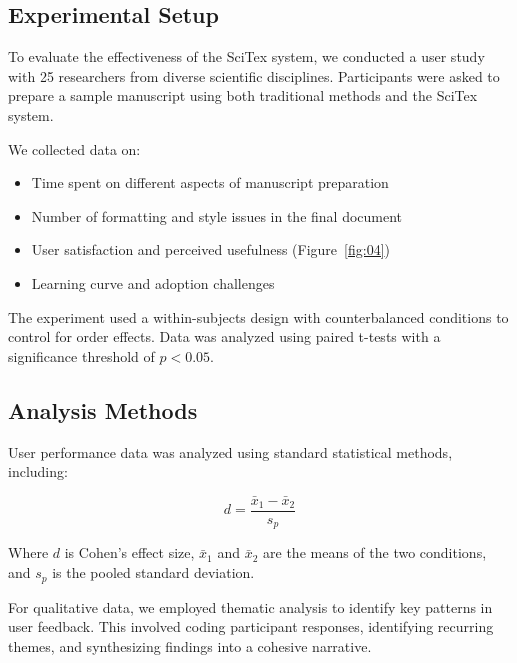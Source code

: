 \subsection{Experimental Setup}

To evaluate the effectiveness of the SciTex system, we conducted a user study with 25 researchers from diverse scientific disciplines. Participants were asked to prepare a sample manuscript using both traditional methods and the SciTex system.

We collected data on:
\begin{itemize}
    \item Time spent on different aspects of manuscript preparation
    \item Number of formatting and style issues in the final document
    \item User satisfaction and perceived usefulness (Figure~\ref{fig:04})
    \item Learning curve and adoption challenges
\end{itemize}

The experiment used a within-subjects design with counterbalanced conditions to control for order effects. Data was analyzed using paired t-tests with a significance threshold of $p < 0.05$.

\subsection{Analysis Methods}

User performance data was analyzed using standard statistical methods, including:

\begin{equation}
\label{eq:effect_size}
d = \frac{\bar{x}_1 - \bar{x}_2}{s_p}
\end{equation}

Where $d$ is Cohen's effect size, $\bar{x}_1$ and $\bar{x}_2$ are the means of the two conditions, and $s_p$ is the pooled standard deviation.

For qualitative data, we employed thematic analysis \cite{braun2006using} to identify key patterns in user feedback. This involved coding participant responses, identifying recurring themes, and synthesizing findings into a cohesive narrative.